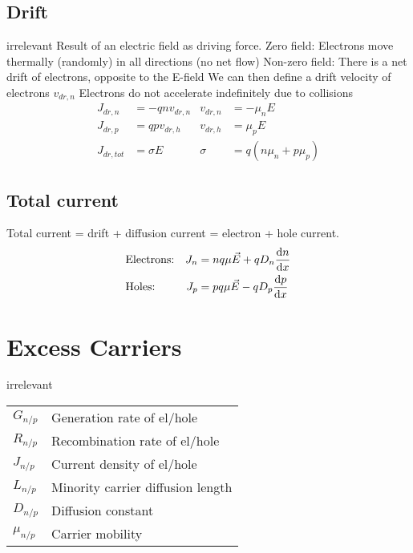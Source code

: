 \documentclass[a4paper, fontsize=8pt, landscape, DIV=1]{scrartcl}
\newcommand{\makeultracompact}{irrelevant}
\begin{document}
\begin{multicols*}{4}
  \subsection{Drift}
    \ifdefined\makeultracompact\else
      Result of an electric field as driving force.
      Zero field: Electrons move thermally (randomly) in all directions (no net flow)
      Non-zero field: There is a net drift of electrons, opposite to the E-field
      We can then define a drift velocity of electrons $v_{dr,n}$
      Electrons do not accelerate indefinitely due to collisions
    \fi
    \begin{align*}
      J_{dr,n} &= -qnv_{dr,n} & v_{dr,n} &= -\mu_nE \\
      J_{dr,p} &= qpv_{dr,h} & v_{dr,h} &= \mu_pE \\
      J_{dr,tot} &= \sigma E & \sigma &= q(n\mu_n + p\mu_p)
    \end{align*}
  
  \subsection{Total current}
    Total current = drift + diffusion current = electron + hole current.
    \begin{align*}
      &\text{Electrons:} & J_n &= nq\mu\vec{E}+qD_n\frac{\mathrm{d}n}{\mathrm{d}x} \\
      &\text{Holes:} & J_p &= pq\mu\vec{E}-qD_p\frac{\mathrm{d}p}{\mathrm{d}x} \\
    \end{align*}

  \section{Excess Carriers}
   
  \ifdefined\makeultracompact
  \else
    \begin{tabular}[h]{l l}
      $G_{n/p}$   & Generation rate of el/hole \\
      $R_{n/p}$   & Recombination rate of el/hole \\
      $J_{n/p}$   & Current density of el/hole \\
      $L_{n/p}$   & Minority carrier diffusion length \\
      $D_{n/p}$   & Diffusion constant \\
      $\mu_{n/p}$ & Carrier mobility \\
    \end{tabular}
  \fi


\end{multicols*}
\end{document}
